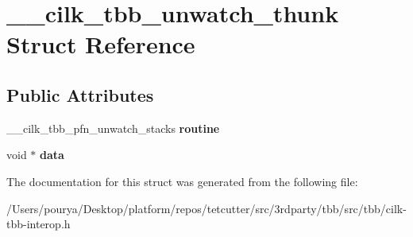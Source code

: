 \hypertarget{struct____cilk__tbb__unwatch__thunk}{}\section{\+\_\+\+\_\+cilk\+\_\+tbb\+\_\+unwatch\+\_\+thunk Struct Reference}
\label{struct____cilk__tbb__unwatch__thunk}
\subsection*{Public Attributes}
\begin{DoxyCompactItemize}
\item 
\hypertarget{struct____cilk__tbb__unwatch__thunk_a947c5522a2d1e9a4a42147afcad26162}{}\+\_\+\+\_\+cilk\+\_\+tbb\+\_\+pfn\+\_\+unwatch\+\_\+stacks {\bfseries routine}\label{struct____cilk__tbb__unwatch__thunk_a947c5522a2d1e9a4a42147afcad26162}

\item 
\hypertarget{struct____cilk__tbb__unwatch__thunk_ac2062c13c32d6b48804bfc7ca089cc3e}{}void $\ast$ {\bfseries data}\label{struct____cilk__tbb__unwatch__thunk_ac2062c13c32d6b48804bfc7ca089cc3e}

\end{DoxyCompactItemize}


The documentation for this struct was generated from the following file\+:\begin{DoxyCompactItemize}
\item 
/\+Users/pourya/\+Desktop/platform/repos/tetcutter/src/3rdparty/tbb/src/tbb/cilk-\/tbb-\/interop.\+h\end{DoxyCompactItemize}
